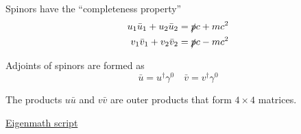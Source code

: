 Spinors have the ``completeness property''
\begin{align*}
u_1\bar u_1+u_2\bar u_2&=\slashed pc+mc^2
\\
v_1\bar v_1+v_2\bar v_2&=\slashed pc-mc^2
\end{align*}

Adjoints of spinors are formed as
\begin{equation*}
\bar u=u^\dag\gamma^0
\quad
\bar v=v^\dag\gamma^0
\end{equation*}

The products $u\bar u$ and $v\bar v$ are outer products that form $4\times4$ matrices.

\bigskip
\href{https://georgeweigt.github.io/examples/dirac-equation-4-demo.html}{Eigenmath script}


